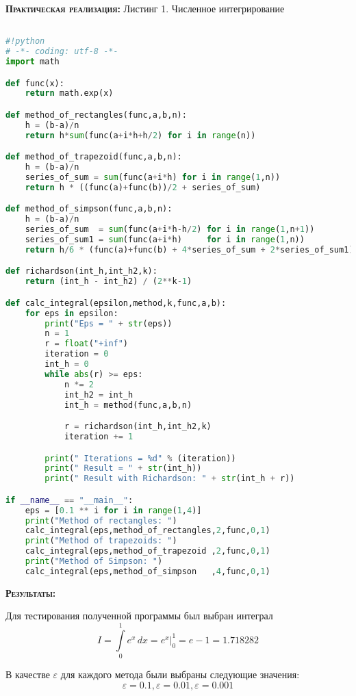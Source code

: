 \documentclass [12pt]{article}
\begin{document}
\textsc{\textbf{Практическая реализация:}}
Листинг 1. Численное интегрирование
\begin{lstlisting}[language=python]

#!python
# -*- coding: utf-8 -*-
import math

def func(x):
    return math.exp(x)

def method_of_rectangles(func,a,b,n):
    h = (b-a)/n
    return h*sum(func(a+i*h+h/2) for i in range(n))

def method_of_trapezoid(func,a,b,n):
    h = (b-a)/n
    series_of_sum = sum(func(a+i*h) for i in range(1,n))
    return h * ((func(a)+func(b))/2 + series_of_sum)

def method_of_simpson(func,a,b,n):
    h = (b-a)/n
    series_of_sum  = sum(func(a+i*h-h/2) for i in range(1,n+1))
    series_of_sum1 = sum(func(a+i*h)     for i in range(1,n))
    return h/6 * (func(a)+func(b) + 4*series_of_sum + 2*series_of_sum1)

def richardson(int_h,int_h2,k):
    return (int_h - int_h2) / (2**k-1)

def calc_integral(epsilon,method,k,func,a,b):
    for eps in epsilon:
        print("Eps = " + str(eps))
        n = 1
        r = float("+inf")
        iteration = 0
        int_h = 0
        while abs(r) >= eps:
            n *= 2
            int_h2 = int_h
            int_h = method(func,a,b,n)

            r = richardson(int_h,int_h2,k)
            iteration += 1

        print(" Iterations = %d" % (iteration))
        print(" Result = " + str(int_h))
        print(" Result with Richardson: " + str(int_h + r))

if __name__ == "__main__":
    eps = [0.1 ** i for i in range(1,4)]
    print("Method of rectangles: ")
    calc_integral(eps,method_of_rectangles,2,func,0,1)
    print("Method of trapezoids: ")
    calc_integral(eps,method_of_trapezoid ,2,func,0,1)
    print("Method of Simpson: ")
    calc_integral(eps,method_of_simpson   ,4,func,0,1)

\end{lstlisting}

\textsc{\textbf{Результаты:}}

Для тестирования полученной программы был выбран интеграл $$ I = \int\limits_0^1 e^x\,dx = e^x \bigg|_0^1 = e - 1 = 1.718282$$

В качестве  $\varepsilon$ для каждого метода были выбраны следующие значения: $$\varepsilon=0.1,\varepsilon=0.01,\varepsilon=0.001$$
\end{document}
